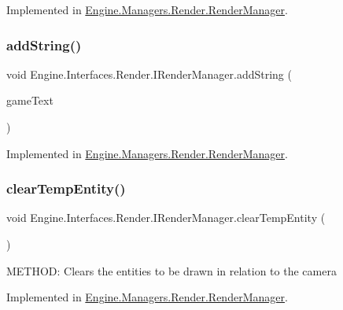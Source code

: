 Implemented in \hyperlink{a00526_a9d572b8cd8ba3c6cac622dee8d14f2a1}{Engine.\+Managers.\+Render.\+Render\+Manager}.

\mbox{\label{a00458_ae3d8ed9fc1406b62e04ac8336e4e40b3}} 
\subsubsection{\texorpdfstring{add\+String()}{addString()}}
{\footnotesize\ttfamily void Engine.\+Interfaces.\+Render.\+I\+Render\+Manager.\+add\+String (\begin{DoxyParamCaption}\item[{\hyperlink{a00598}{Game\+Text}}]{game\+Text }\end{DoxyParamCaption})}



Implemented in \hyperlink{a00526_a9ce9959462da544f283ab3e531bd1edb}{Engine.\+Managers.\+Render.\+Render\+Manager}.

\mbox{\label{a00458_a7879b28e310859cdebdc2c8aeaced6b3}} 
\subsubsection{\texorpdfstring{clear\+Temp\+Entity()}{clearTempEntity()}}
{\footnotesize\ttfamily void Engine.\+Interfaces.\+Render.\+I\+Render\+Manager.\+clear\+Temp\+Entity (\begin{DoxyParamCaption}{ }\end{DoxyParamCaption})}



M\+E\+T\+H\+OD\+: Clears the entities to be drawn in relation to the camera 



Implemented in \hyperlink{a00526_af77caeb94739b508306100cdedfcbd9b}{Engine.\+Managers.\+Render.\+Render\+Manager}.

